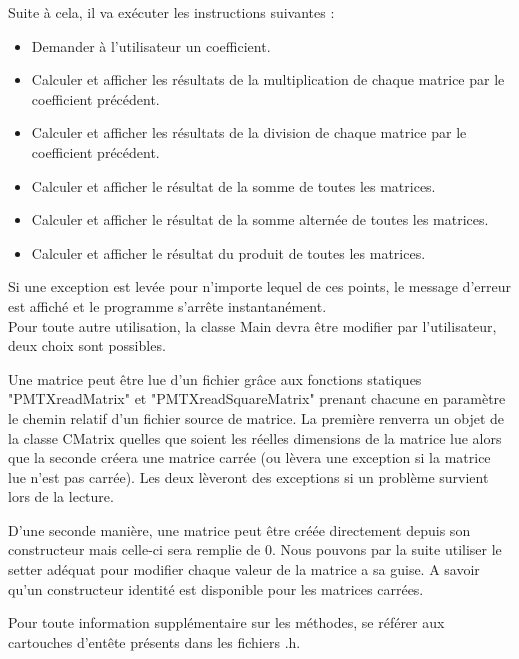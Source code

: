 	Suite à cela, il va exécuter les instructions suivantes :
	\begin{itemize}
		\item Demander à l'utilisateur un coefficient.
		\item Calculer et afficher les résultats de la multiplication de chaque matrice par le coefficient précédent.
		\item Calculer et afficher les résultats de la division de chaque matrice par le coefficient précédent.
		\item Calculer et afficher le résultat de la somme de toutes les matrices.
		\item Calculer et afficher le résultat de la somme alternée de toutes les matrices.
		\item Calculer et afficher le résultat du produit de toutes les matrices. \\
	\end{itemize}
	Si une exception est levée pour n'importe lequel de ces points, le message d'erreur est affiché et le programme s'arrête instantanément.\\
	
	Pour toute autre utilisation, la classe Main devra être modifier par l'utilisateur, deux choix sont possibles.
	
	Une matrice peut être lue d'un fichier grâce aux fonctions statiques "PMTXreadMatrix" et "PMTXreadSquareMatrix" prenant chacune en paramètre le chemin relatif d'un fichier source de matrice. La première renverra un objet de la classe CMatrix quelles que soient les réelles dimensions de la matrice lue alors que la seconde créera une matrice carrée (ou lèvera une exception si la matrice lue n'est pas carrée). Les deux lèveront des exceptions si un problème survient lors de la lecture.
	
	D'une seconde manière, une matrice peut être créée directement depuis son constructeur mais celle-ci sera remplie de 0. Nous pouvons par la suite utiliser le setter adéquat pour modifier chaque valeur de la matrice a sa guise. A savoir qu'un constructeur identité est disponible pour les matrices carrées.

	Pour toute information supplémentaire sur les méthodes, se référer aux cartouches d'entête présents dans les fichiers .h.

